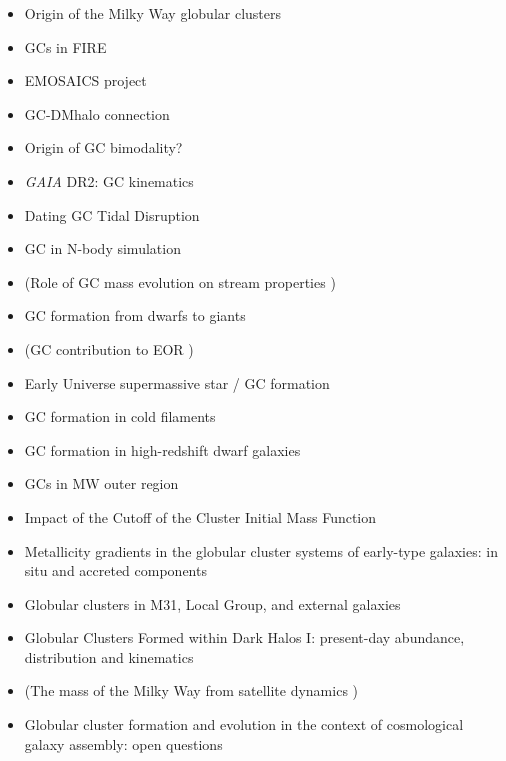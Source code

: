 \documentclass[a4paper,fleqn,usenatbib]{mnras}
\begin{document}
\begin{itemize}
\item Origin of the Milky Way globular clusters \citep{2017MNRAS.465.3622R}
\item GCs in FIRE \citep{2018MNRAS.474.4232K}
\item EMOSAICS project \citep{2018MNRAS.475.4309P}
\item GC-DMhalo connection \citep{2017MNRAS.472.3120B}
\item Origin of GC bimodality? \citep{2018MNRAS.479..200F}
\item \textit{GAIA} DR2: GC kinematics \citep{2018A&A...616A..12G}
\item Dating GC Tidal Disruption \citep{2018ApJ...859L..13B}
\item GC in N-body simulation \citep{2018ApJ...861...69C}
\item (Role of GC mass evolution on stream properties \citep{2018MNRAS.474.2479B})
\item GC formation from dwarfs to giants \citep{2018MNRAS.480.2343C}
\item (GC contribution to EOR \citep{2018MNRAS.479..332B})
\item Early Universe supermassive star / GC formation \citep{2018MNRAS.478.2461G}
\item GC formation in cold filaments \citep{2018ApJ...861..148M}
\item GC formation in high-redshift dwarf galaxies \citep{2018MNRAS.477..480Z}
\item GCs in MW outer region \citep{2017arXiv170804542P}
\item Impact of the Cutoff of the Cluster Initial Mass Function \citep{2018arXiv181001888C}
\item Metallicity gradients in the globular cluster systems of early-type galaxies: in situ and accreted components \citep{2018MNRAS.479.4760F}
\item Globular clusters in M31, Local Group, and external galaxies \citep{2016IAUS..317..120L}
\item Globular Clusters Formed within Dark Halos I: present-day abundance, distribution and kinematics \citep{2019MNRAS.482..219C}
\item (The mass of the Milky Way from satellite dynamics \citep{2018arXiv180810456C})
\item Globular cluster formation and evolution in the context of cosmological galaxy assembly: open questions \citep{2018RSPSA.47470616F}

\end{itemize}
\end{document}
